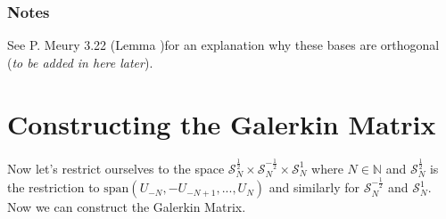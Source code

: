 \documentclass[10pt,journal,compsoc, onecolumn]{IEEEtran}
\begin{document}
\subsubsection*{Notes}
See P. Meury 3.22 (Lemma )for an explanation why these bases are orthogonal 
(\textit{to be added in here later}).

\section{Constructing the Galerkin Matrix}
Now let's restrict ourselves to the space $\mathcal{S}_N^{\frac{1}{2}} 
\times \mathcal{S}_N^{-\frac{1}{2}} \times \mathcal{S}_N^{1}$ where $N \in \mathbb{N}$ 
and $\mathcal{S}_N^{\frac{1}{2}}$ is the restriction to $\mathrm{span}(U_{-N}, -U_{-N+1}, ..., U_N)$ and similarly 
for $\mathcal{S}_N^{-\frac{1}{2}}$ and $\mathcal{S}_N^{1}$.
Now we can construct the Galerkin Matrix.
\end{document}
